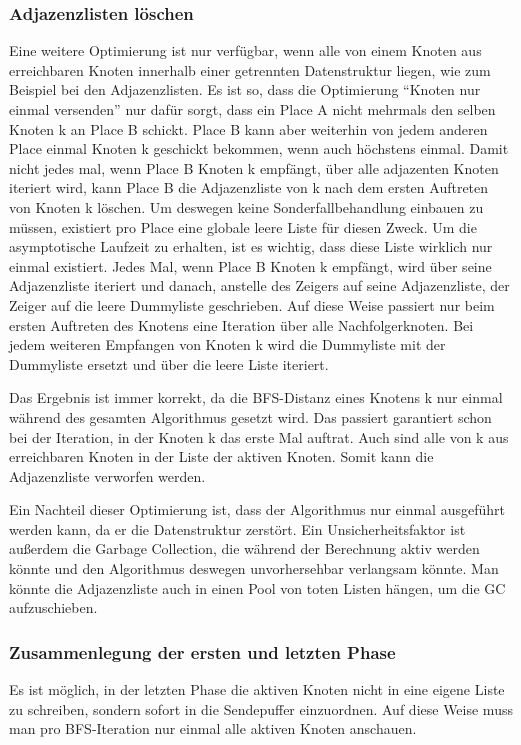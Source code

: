 \subsubsection{Adjazenzlisten löschen} %
\label{ssub:adjazenslisten_löschen}
Eine weitere Optimierung ist nur verfügbar, wenn alle von einem Knoten aus erreichbaren Knoten innerhalb einer getrennten Datenstruktur liegen, wie zum Beispiel bei den Adjazenzlisten. Es ist so, dass die Optimierung \enquote{Knoten nur einmal versenden} nur dafür sorgt, dass ein Place A nicht mehrmals den selben Knoten k an Place B schickt. Place B kann aber weiterhin von jedem anderen Place einmal Knoten k geschickt bekommen, wenn auch höchstens einmal. Damit nicht jedes mal, wenn Place B Knoten k empfängt, über alle adjazenten Knoten iteriert wird, kann Place B die Adjazenzliste von k nach dem ersten Auftreten von Knoten k löschen. Um deswegen keine Sonderfallbehandlung einbauen zu müssen, existiert pro Place eine globale leere Liste für diesen Zweck. Um die asymptotische Laufzeit zu erhalten, ist es wichtig, dass diese Liste wirklich nur einmal existiert. Jedes Mal, wenn Place B Knoten k empfängt, wird über seine Adjazenzliste iteriert und danach, anstelle des Zeigers auf seine Adjazenzliste, der Zeiger auf die leere Dummyliste geschrieben. Auf diese Weise passiert nur beim ersten Auftreten des Knotens eine Iteration über alle Nachfolgerknoten. Bei jedem weiteren Empfangen von Knoten k wird die Dummyliste mit der Dummyliste ersetzt und über die leere Liste iteriert.

Das Ergebnis ist immer korrekt, da die BFS-Distanz eines Knotens k nur einmal während des gesamten Algorithmus gesetzt wird. Das passiert garantiert schon bei der Iteration, in der Knoten k das erste Mal auftrat. Auch sind alle von k aus erreichbaren Knoten in der Liste der aktiven Knoten. Somit kann die Adjazenzliste verworfen werden.

Ein Nachteil dieser Optimierung ist, dass der Algorithmus nur einmal ausgeführt werden kann, da er die Datenstruktur zerstört. Ein Unsicherheitsfaktor ist außerdem die Garbage Collection, die während der Berechnung aktiv werden könnte und den Algorithmus deswegen unvorhersehbar verlangsam könnte. Man könnte die Adjazenzliste auch in einen Pool von toten Listen hängen, um die GC aufzuschieben.
\subsubsection{Zusammenlegung der ersten und letzten Phase} %
\label{ssub:zusammenlegung_der_ersten_und_letzten_phase}
Es ist möglich, in der letzten Phase die aktiven Knoten nicht in eine eigene Liste zu schreiben, sondern sofort in die Sendepuffer einzuordnen. Auf diese Weise muss man pro BFS-Iteration nur einmal alle aktiven Knoten anschauen.

